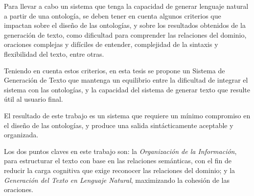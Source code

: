 Para llevar a cabo un sistema que tenga la capacidad de generar lenguaje natural a partir de una ontología, se deben tener en cuenta algunos criterios que impactan sobre el diseño de las ontologías, y sobre los resultados obtenidos de la generación de texto, como dificultad para comprender las relaciones del dominio, oraciones complejas y difíciles de entender, complejidad de la sintaxis y flexibilidad del texto, entre otras. 

Teniendo en cuenta estos criterios, en esta tesis se propone un Sistema de Generación de Texto que mantenga un equilibrio entre la dificultad de integrar el sistema con las ontologías, y la capacidad del sistema de generar texto que resulte útil al usuario final. 

El resultado de este trabajo es un sistema que requiere un mínimo compromiso en el diseño de las ontologías, y produce una salida sintácticamente aceptable y organizada.

Los dos puntos claves en este trabajo son: la \textit{Organización de la Información}, para estructurar el texto con base en las relaciones semánticas, con el fin de reducir la carga cognitiva que exige reconocer las relaciones del dominio; y la \textit{Generación del Texto en Lenguaje Natural}, maximizando la cohesión de las oraciones.

\vfill
\pagebreak
